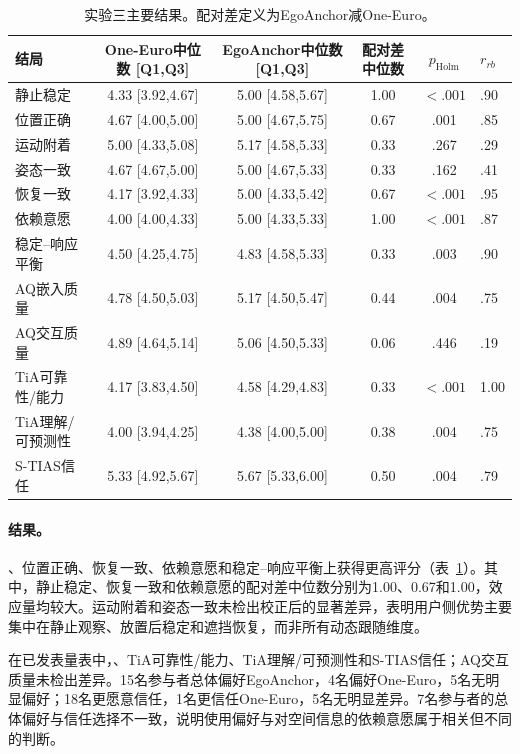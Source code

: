 \documentclass[review]{vgtc}
\newcommand{\system}{EgoAnchor}
\begin{document}
\begin{table}[t]
\centering
\caption{实验三主要结果。配对差定义为EgoAnchor减One-Euro。}
\label{tab:exp3}
\small
\begin{tabularx}{\textwidth}{lccccl}
\toprule
结局 & One-Euro中位数 [Q1,Q3] & EgoAnchor中位数 [Q1,Q3] & 配对差中位数 & $p_{\mathrm{Holm}}$ & $r_{rb}$ \\
\midrule
静止稳定 & 4.33 [3.92,4.67] & 5.00 [4.58,5.67] & 1.00 & $<.001$ & .90 \\
位置正确 & 4.67 [4.00,5.00] & 5.00 [4.67,5.75] & 0.67 & .001 & .85 \\
运动附着 & 5.00 [4.33,5.08] & 5.17 [4.58,5.33] & 0.33 & .267 & .29 \\
姿态一致 & 4.67 [4.67,5.00] & 5.00 [4.67,5.33] & 0.33 & .162 & .41 \\
恢复一致 & 4.17 [3.92,4.33] & 5.00 [4.33,5.42] & 0.67 & $<.001$ & .95 \\
依赖意愿 & 4.00 [4.00,4.33] & 5.00 [4.33,5.33] & 1.00 & $<.001$ & .87 \\
稳定--响应平衡 & 4.50 [4.25,4.75] & 4.83 [4.58,5.33] & 0.33 & .003 & .90 \\
\midrule
AQ嵌入质量 & 4.78 [4.50,5.03] & 5.17 [4.50,5.47] & 0.44 & .004 & .75 \\
AQ交互质量 & 4.89 [4.64,5.14] & 5.06 [4.50,5.33] & 0.06 & .446 & .19 \\
TiA可靠性/能力 & 4.17 [3.83,4.50] & 4.58 [4.29,4.83] & 0.33 & $<.001$ & 1.00 \\
TiA理解/可预测性 & 4.00 [3.94,4.25] & 4.38 [4.00,5.00] & 0.38 & .004 & .75 \\
S-TIAS信任 & 5.33 [4.92,5.67] & 5.67 [5.33,6.00] & 0.50 & .004 & .79 \\
\bottomrule
\end{tabularx}
\end{table}

\paragraph{结果。}
、位置正确、恢复一致、依赖意愿和稳定--响应平衡上获得更高评分（表~\ref{tab:exp3}）。其中，静止稳定、恢复一致和依赖意愿的配对差中位数分别为1.00、0.67和1.00，效应量均较大。运动附着和姿态一致未检出校正后的显著差异，表明用户侧优势主要集中在静止观察、放置后稳定和遮挡恢复，而非所有动态跟随维度。

在已发表量表中，、TiA可靠性/能力、TiA理解/可预测性和S-TIAS信任；AQ交互质量未检出差异。15名参与者总体偏好\system，4名偏好One-Euro，5名无明显偏好；18名更愿意信任，1名更信任One-Euro，5名无明显差异。7名参与者的总体偏好与信任选择不一致，说明使用偏好与对空间信息的依赖意愿属于相关但不同的判断。
\end{document}
